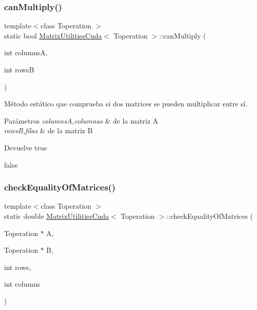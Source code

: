 \subsubsection{\texorpdfstring{can\+Multiply()}{canMultiply()}}
{\footnotesize\ttfamily template$<$class Toperation $>$ \\
static bool \hyperlink{classMatrixUtilitiesCuda}{Matrix\+Utilities\+Cuda}$<$ Toperation $>$\+::can\+Multiply (\begin{DoxyParamCaption}\item[{int}]{columnsA,  }\item[{int}]{rowsB }\end{DoxyParamCaption})\hspace{0.3cm}{\ttfamily [static]}}



Método estático que comprueba si dos matrices se pueden multiplicar entre sí. 


\begin{DoxyParams}{Parámetros}
{\em columnsA,columnas} & de la matriz A \\
\hline
{\em rowsB,filas} & de la matriz B \\
\hline
\end{DoxyParams}
\begin{DoxyReturn}{Devuelve}
true 

false 
\end{DoxyReturn}
\mbox{\label{classMatrixUtilitiesCuda_a0272d126a916842c8838495eefbf31cd}} 
\subsubsection{\texorpdfstring{check\+Equality\+Of\+Matrices()}{checkEqualityOfMatrices()}}
{\footnotesize\ttfamily template$<$class Toperation $>$ \\
static double \hyperlink{classMatrixUtilitiesCuda}{Matrix\+Utilities\+Cuda}$<$ Toperation $>$\+::check\+Equality\+Of\+Matrices (\begin{DoxyParamCaption}\item[{Toperation $\ast$}]{A,  }\item[{Toperation $\ast$}]{B,  }\item[{int}]{rows,  }\item[{int}]{columns }\end{DoxyParamCaption})\hspace{0.3cm}{\ttfamily [static]}}



